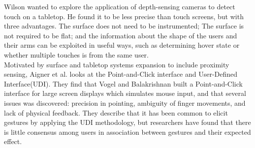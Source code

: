 Wilson \cite{Wilson:2010} wanted to explore the application of depth-sensing cameras to detect touch on a tabletop. He found it to be less precise than touch screens, but with three advantages. The surface does not need to be instrumented; The surface is not required to be flat; and the information about the shape of the users and their arms can be exploited in useful ways, such as determining hover state or whether multiple touches is from the same user. \cite{Wilson:2010}\\


Motivated by surface and tabletop systems expansion to include proximity sensing, Aigner et al.\cite{Aigner:2012} looks at the Point-and-Click interface and User-Defined Interface(UDI). They find that Vogel and Balakrishnan \cite{Vogel:2005} built a Point-and-Click interface for large screen displays which simulates mouse input, and that several issues was discovered: precision in pointing, ambiguity of finger movements, and lack of physical feedback. They describe that it has been common to elicit gestures by applying the UDI methodology, but researchers have found that there is little consensus among users in association between gestures and their expected effect.\\

